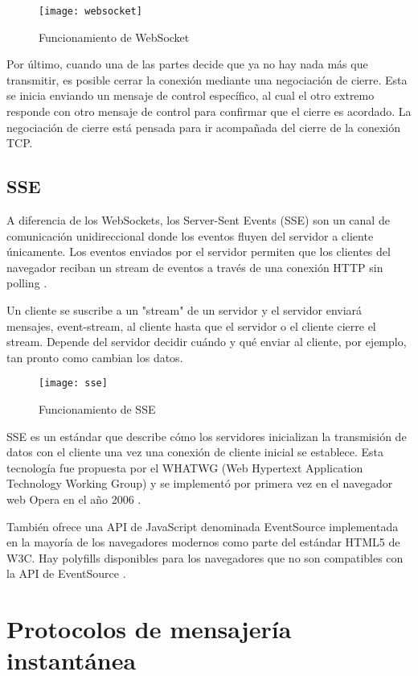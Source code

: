 \begin{figure}[htp!]
  \centering
  \texttt{[image: websocket]}
  \caption{Funcionamiento de WebSocket}
  \label{fig:websocket}
\end{figure}

Por último, cuando una de las partes decide que ya no hay nada más que transmitir, es posible cerrar la conexión mediante una negociación de cierre. Esta se inicia enviando un mensaje de control específico, al cual el otro extremo responde con otro mensaje de control para confirmar que el cierre es acordado. La negociación de cierre está pensada para ir acompañada del cierre de la conexión TCP.

\subsection{SSE}

A diferencia de los WebSockets, los Server-Sent Events (SSE) son un canal de comunicación unidireccional donde los eventos fluyen del servidor a cliente únicamente. Los eventos enviados por el servidor permiten que los clientes del navegador reciban un stream de eventos a través de una conexión HTTP sin polling \cite{sse2}.

Un cliente se suscribe a un "stream" de un servidor y el servidor enviará mensajes, event-stream, al cliente hasta que el servidor o el cliente cierre el stream. Depende del servidor decidir cuándo y qué enviar al cliente, por ejemplo, tan pronto como cambian los datos.

\begin{figure}[htp!]
  \centering
  \texttt{[image: sse]}
  \caption{Funcionamiento de SSE}
  \label{fig:sse}
\end{figure}

SSE es un estándar que describe cómo los servidores inicializan la transmisión de datos con el cliente una vez una conexión de cliente inicial se establece. Esta tecnología fue propuesta por el WHATWG (Web Hypertext Application Technology Working Group) y se implementó por primera vez en el navegador web Opera en el año 2006 \cite{sse1}.

También ofrece una API de JavaScript denominada EventSource implementada en la mayoría de los navegadores modernos como parte del estándar HTML5 de W3C. Hay polyfills disponibles para los navegadores que no son compatibles con la API de EventSource \cite{sse3}.

\section{Protocolos de mensajería instantánea}


